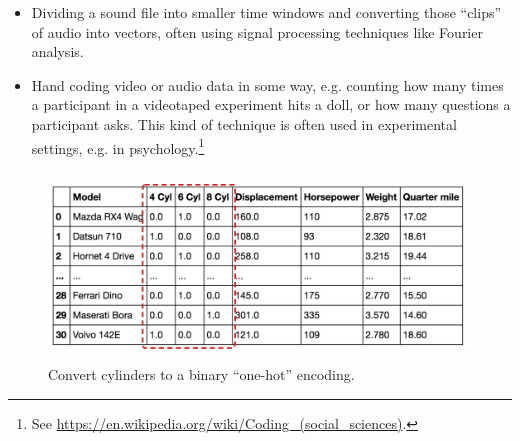 \begin{itemize}
\item Dividing a sound file into smaller time windows and converting those ``clips'' of audio into vectors, often using signal processing techniques like Fourier analysis.
\item Hand coding video or audio data in some way, e.g. counting how many times a participant in a videotaped experiment hits a doll, or how many questions a participant asks. This kind of technique is often used in experimental settings, e.g. in psychology.\footnote{See \url{https://en.wikipedia.org/wiki/Coding_(social_sciences)}.}
\end{itemize}

\begin{figure}[h]
\centering
\includegraphics[height=50mm]{./images/CarsOneHot.png}
\caption[Screenshot of the Motor Trend Car Road Tests dataset included in R.]{Convert cylinders to a binary ``one-hot'' encoding.}
\label{cars_onehot}
\end{figure}

